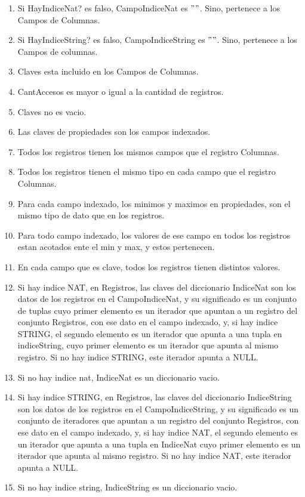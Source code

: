 \begin{Representacion}
    \begin{enumerate} 
		\item Si HayIndiceNat? es falso, CampoIndiceNat es $""$. Sino, pertenece a los Campos de Columnas.
		\item Si HayIndiceString? es falso, CampoIndiceString es $""$. Sino, pertenece a los  Campos de columnas.
        \item Claves esta incluido en los Campos de Columnas.
        \item CantAccesos es mayor o igual a la cantidad de registros.
        \item Claves no es vacio.
        \item Las claves de propiedades son los campos indexados.
        \item Todos los registros tienen los mismos campos que el registro Columnas.
        \item Todos los registros tienen el mismo tipo en cada campo que el registro Columnas.
        \item Para cada campo indexado, los minimos y maximos en propiedades, son el mismo tipo de dato que en los registros.
		\item Para todo campo indexado, los valores de ese campo en todos los registros estan acotados ente el min y max, y estos pertenecen.
        \item En cada campo que es clave, todos los registros tienen distintos valores.
        \item Si hay indice NAT, en Registros, las claves del diccionario IndiceNat son los datos de los registros en el CampoIndiceNat, y su significado es un conjunto de tuplas cuyo primer elemento es un iterador que apuntan a un registro del conjunto Registros, con ese dato en el campo indexado, y, si hay indice STRING, el segundo elemento es un iterador que apunta a una tupla en indiceString, cuyo primer elemento es un iterador que apunta al mismo registro. Si no hay indice STRING, este iterador apunta a NULL. 
        \item Si no hay indice nat, IndiceNat es un diccionario vacio.
        \item Si hay indice STRING, en Registros, las claves del diccionario IndiceString son los datos de los registros en el CampoIndiceString, y su significado es un conjunto de iteradores que apuntan a un registro del conjunto Registros, con ese dato en el campo indexado, y, si hay indice NAT, el segundo elemento es un iterador que apunta a una tupla en IndiceNat cuyo primer elemento es un iterador que apunta al mismo registro. Si no hay indice NAT, este iterador apunta a NULL. 
        \item Si no hay indice string, IndiceString es un diccionario vacio.
        

\end{enumerate}
\end{Representacion}
